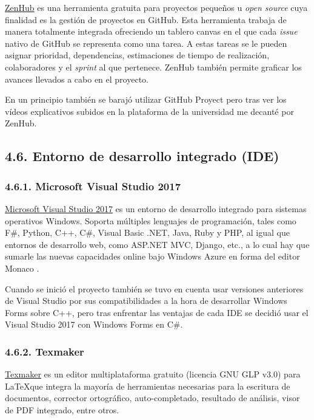 \href{https://www.zenhub.com/}{ZenHub} es una herramienta gratuita para proyectos pequeños u \textit{open source} cuya finalidad es la gestión de proyectos en GitHub. Esta herramienta trabaja de manera totalmente integrada ofreciendo un tablero canvas en el que cada \textit{issue} nativo de GitHub se representa como una tarea. A estas tareas se le pueden asignar prioridad, dependencias, estimaciones de tiempo de realización, colaboradores y el \textit{sprint} al que pertenece. ZenHub también permite graficar los avances llevados a cabo en el proyecto.

En un principio también se barajó utilizar GitHub Proyect pero tras ver los vídeos explicativos subidos en la plataforma de la universidad me decanté por ZenHub.

\subsection{4.6. Entorno de desarrollo integrado (IDE)}

\subsubsection{4.6.1. Microsoft Visual Studio 2017}

\href{https://visualstudio.microsoft.com/es/vs/}{Microsoft Visual Studio 2017} es un entorno de desarrollo integrado para sistemas operativos Windows. Soporta múltiples lenguajes de programación, tales como F\#, Python, C++, C\#, Visual Basic .NET, Java, Ruby y PHP, al igual que entornos de desarrollo web, como ASP.NET MVC, Django, etc., a lo cual hay que sumarle las nuevas capacidades online bajo Windows Azure en forma del editor Monaco \cite{wiki:visualstudio}.

Cuando se inició el proyecto también se tuvo en cuenta usar versiones anteriores de Visual Studio por sus compatibilidades a la hora de desarrollar Windows Forms sobre C++, pero tras enfrentar las ventajas de cada IDE se decidió usar el Visual Studio 2017 con Windows Forms en C\#.

\subsubsection{4.6.2. Texmaker}

\href{http://www.xm1math.net/texmaker/}{Texmaker} es un editor multiplataforma gratuito (licencia GNU GLP v3.0) para \LaTeX que integra la mayoría de herramientas necesarias para la escritura de documentos, corrector ortográfico, auto-completado, resultado de análisis, visor de PDF integrado, entre otros.

